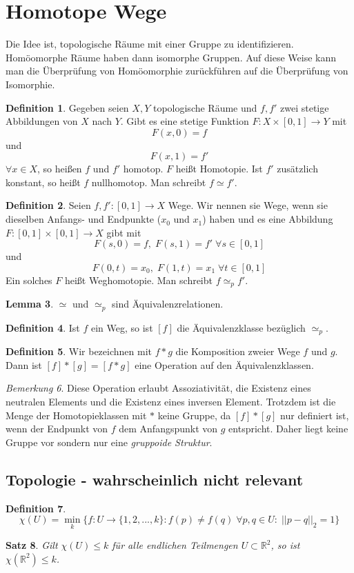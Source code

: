 \documentclass[a4paper, 12pt]{article}
\theoremstyle{plain}
\newtheorem{theorem}{Satz}[section] %
\theoremstyle{definition}
\newtheorem{definition}[theorem]{Definition} %
\theoremstyle{lemma}
\newtheorem{lemma}[theorem]{Lemma}
\theoremstyle{remark}
\newtheorem{remark}[theorem]{Bemerkung}
\theoremstyle{corollary}
\theoremstyle{example}
\begin{document}
\section{Homotope Wege}
	Die Idee ist, topologische Räume mit einer Gruppe zu identifizieren. Homöomorphe Räume haben dann isomorphe Gruppen. Auf diese Weise kann man die Überprüfung von Homöomorphie zurückführen auf die Überprüfung von Isomorphie.
	\begin{definition}
		Gegeben seien $X,Y$ topologische Räume und $f,f'$ zwei stetige Abbildungen von $X$ nach $Y$. Gibt es eine stetige Funktion $F:X\times [0,1] \to Y$ mit \[F(x,0) = f\] und \[F(x,1) = f'\] $\forall x \in X$, so heißen $f$ und $f'$ homotop. $F$ heißt Homotopie. Ist $f'$ zusätzlich konstant, so heißt $f$ nullhomotop. Man schreibt $f\simeq f'$.
	\end{definition}
	\begin{definition}
		Seien $f,f': [0,1] \to X$ Wege. Wir nennen sie Wege, wenn sie dieselben Anfangs- und Endpunkte ($x_0$ und $x_1$) haben und es eine Abbildung $F: [0,1]\times [0,1] \to X$ gibt mit \[F(s,0) = f, \; F(s,1) = f' \; \forall s \in [0,1]\] und \[F(0,t) = x_0, \; F(1,t) = x_1 \; \forall t \in [0,1]\]
		Ein solches $F$ heißt Weghomotopie. Man schreibt $f \simeq_p f'$.
	\end{definition}
	\begin{lemma}
		$\simeq$ und $\simeq_p$ sind Äquivalenzrelationen.
	\end{lemma}
	\begin{definition}
		Ist $f$ ein Weg, so ist $[f]$ die Äquivalenzklasse bezüglich $\simeq_p$.
	\end{definition}
	\begin{definition}
		Wir bezeichnen mit $f*g$ die Komposition zweier Wege $f$ und $g$. Dann ist $[f]*[g] = [f*g]$ eine Operation auf den Äquivalenzklassen.
	\end{definition}
	\begin{remark}
		Diese Operation erlaubt Assoziativität, die Existenz eines neutralen Elements und die Existenz eines inversen Element. Trotzdem ist die Menge der Homotopieklassen mit $*$ keine Gruppe, da $[f]*[g]$ nur definiert ist, wenn der Endpunkt von $f$ dem Anfangspunkt von $g$ entspricht. Daher liegt keine Gruppe vor sondern nur eine \textit{gruppoide Struktur}.
	\end{remark}
	\subsection{Topologie - wahrscheinlich nicht relevant}
	\begin{definition}
		\[\chi(U) = \min_k \{f:U \to \{1,2,...,k\}: f(p)\neq f(q) \; \forall p,q \in U: \; ||p-q||_2 = 1\}\]
	\end{definition}
	\begin{theorem}
		Gilt $\chi(U) \leq k$ für alle endlichen Teilmengen $U\subset \mathbb{R}^2$, so ist $\chi(\mathbb{R}^2) \leq k$.
	\end{theorem}
\end{document}
